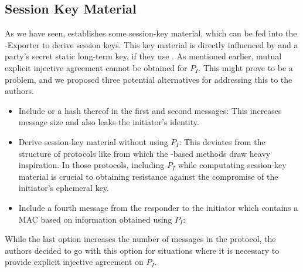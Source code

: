\documentclass[runningheads]{llncs}
\begin{document}
\subsection{Session Key Material}
\label{sec:sessionKeyMaterial}
As we have seen, \mEdhoc{} establishes some
session-key material, which can be fed into the \mEdhoc{}-Exporter to derive
session keys.
%
This key material is directly influenced by \mGxy{} and a party's secret static
long-term key, if they use \mStat{}.
%
As mentioned earlier, mutual explicit injective agreement cannot be obtained for
$P_{I}$.
%
This might prove to be a problem, and we proposed three potential alternatives
for addressing this to the \mEdhoc{} authors.
%
\begin{itemize}
    \item Include \mIdcredi{} or a hash thereof in the first and
    second messages:
%
    This increases message size and also leaks the initiator's identity.
%
    \item Derive session-key material without using $P_{I}$:
%
    This deviates from the structure of protocols like \mOptls{} from which the
    \mStat{}-based methods draw heavy inspiration.
%
    In those protocols, including $P_{I}$ while computating session-key
    material is crucial to obtaining resistance against the compromise of the
    initiator's ephemeral key.
%
    \item Include a fourth message from the
    responder to the initiator which contains a MAC based on information
    obtained using $P_{I}$:
\end{itemize}
%
While the last option increases the number of messages in the protocol, the
\mEdhoc{} authors decided to go with this option for situations where it is
necessary to provide explicit injective agreement on $P_{I}$.
%

\end{document}
